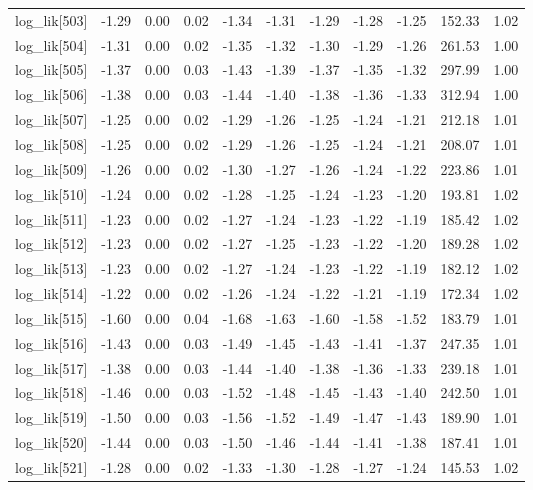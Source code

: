 \begin{table}[ht]
\begin{tabular}{rrrrrrrrrrr}
  log\_lik[503] & -1.29 & 0.00 & 0.02 & -1.34 & -1.31 & -1.29 & -1.28 & -1.25 & 152.33 & 1.02 \\ 
  log\_lik[504] & -1.31 & 0.00 & 0.02 & -1.35 & -1.32 & -1.30 & -1.29 & -1.26 & 261.53 & 1.00 \\ 
  log\_lik[505] & -1.37 & 0.00 & 0.03 & -1.43 & -1.39 & -1.37 & -1.35 & -1.32 & 297.99 & 1.00 \\ 
  log\_lik[506] & -1.38 & 0.00 & 0.03 & -1.44 & -1.40 & -1.38 & -1.36 & -1.33 & 312.94 & 1.00 \\ 
  log\_lik[507] & -1.25 & 0.00 & 0.02 & -1.29 & -1.26 & -1.25 & -1.24 & -1.21 & 212.18 & 1.01 \\ 
  log\_lik[508] & -1.25 & 0.00 & 0.02 & -1.29 & -1.26 & -1.25 & -1.24 & -1.21 & 208.07 & 1.01 \\ 
  log\_lik[509] & -1.26 & 0.00 & 0.02 & -1.30 & -1.27 & -1.26 & -1.24 & -1.22 & 223.86 & 1.01 \\ 
  log\_lik[510] & -1.24 & 0.00 & 0.02 & -1.28 & -1.25 & -1.24 & -1.23 & -1.20 & 193.81 & 1.02 \\ 
  log\_lik[511] & -1.23 & 0.00 & 0.02 & -1.27 & -1.24 & -1.23 & -1.22 & -1.19 & 185.42 & 1.02 \\ 
  log\_lik[512] & -1.23 & 0.00 & 0.02 & -1.27 & -1.25 & -1.23 & -1.22 & -1.20 & 189.28 & 1.02 \\ 
  log\_lik[513] & -1.23 & 0.00 & 0.02 & -1.27 & -1.24 & -1.23 & -1.22 & -1.19 & 182.12 & 1.02 \\ 
  log\_lik[514] & -1.22 & 0.00 & 0.02 & -1.26 & -1.24 & -1.22 & -1.21 & -1.19 & 172.34 & 1.02 \\ 
  log\_lik[515] & -1.60 & 0.00 & 0.04 & -1.68 & -1.63 & -1.60 & -1.58 & -1.52 & 183.79 & 1.01 \\ 
  log\_lik[516] & -1.43 & 0.00 & 0.03 & -1.49 & -1.45 & -1.43 & -1.41 & -1.37 & 247.35 & 1.01 \\ 
  log\_lik[517] & -1.38 & 0.00 & 0.03 & -1.44 & -1.40 & -1.38 & -1.36 & -1.33 & 239.18 & 1.01 \\ 
  log\_lik[518] & -1.46 & 0.00 & 0.03 & -1.52 & -1.48 & -1.45 & -1.43 & -1.40 & 242.50 & 1.01 \\ 
  log\_lik[519] & -1.50 & 0.00 & 0.03 & -1.56 & -1.52 & -1.49 & -1.47 & -1.43 & 189.90 & 1.01 \\ 
  log\_lik[520] & -1.44 & 0.00 & 0.03 & -1.50 & -1.46 & -1.44 & -1.41 & -1.38 & 187.41 & 1.01 \\ 
  log\_lik[521] & -1.28 & 0.00 & 0.02 & -1.33 & -1.30 & -1.28 & -1.27 & -1.24 & 145.53 & 1.02 \\ 

\end{tabular}
\end{table}
